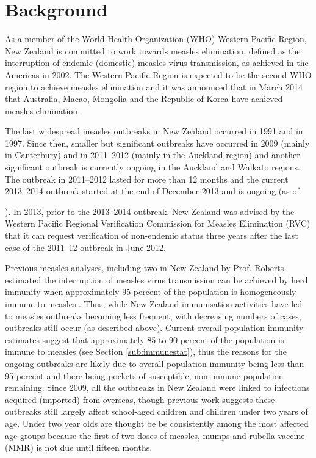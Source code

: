 \documentclass{article}
\begin{document}
\section{Background}

As a member of the World Health Organization (WHO) Western Pacific Region, New Zealand is committed to work towards measles elimination, defined as the interruption of endemic (domestic) measles virus transmission, as achieved in the Americas in 2002. The Western Pacific Region is expected to be the second WHO region to  achieve measles elimination and it was announced that in March 2014 that Australia, Macao, Mongolia and the Republic of Korea have achieved measles elimination.

The last widespread measles outbreaks in New Zealand occurred in 1991 and in 1997. Since then, smaller but significant outbreaks have occurred in 2009 (mainly in Canterbury) and in 2011--2012 (mainly in the Auckland region) and another significant outbreak is currently ongoing in the Auckland and Waikato regions. The outbreak in 2011--2012 lasted for more than 12 months and the current 2013--2014 outbreak started at the end of December 2013 and is ongoing (as of \date{3 July 2014}). In 2013, prior to the 2013--2014 outbreak, New Zealand was advised by the Western Pacific Regional Verification Commission for Measles Elimination (RVC) that it can request verification of non-endemic status three years after the last case of the 2011--12 outbreak in June 2012.

Previous measles analyses, including two in New Zealand by Prof. Roberts, estimated the interruption of measles virus transmission can be achieved by herd immunity when approximately 95 percent of the population is homogeneously immune to measles \citep{roberts0,roberts4}. Thus, while New Zealand immunisation activities have led to measles outbreaks becoming less frequent, with decreasing numbers of cases, outbreaks still occur (as described above). Current overall population immunity estimates suggest that approximately 85 to 90 percent of the population is immune to measles (see Section \ref{sub:immunestat}), thus the reasons for the ongoing outbreaks are likely due to overall population immunity being less than 95 percent and there being pockets of susceptible, non-immune population remaining. Since 2009, all the outbreaks in New Zealand were linked to infections acquired (imported) from overseas, though previous work suggests these outbreaks still largely affect school-aged children and children under two years of age. Under two year olds are thought be be consistently among the most affected age groups because the first of two doses of measles, mumps and rubella vaccine (MMR) is not due until fifteen months.
\end{document}
